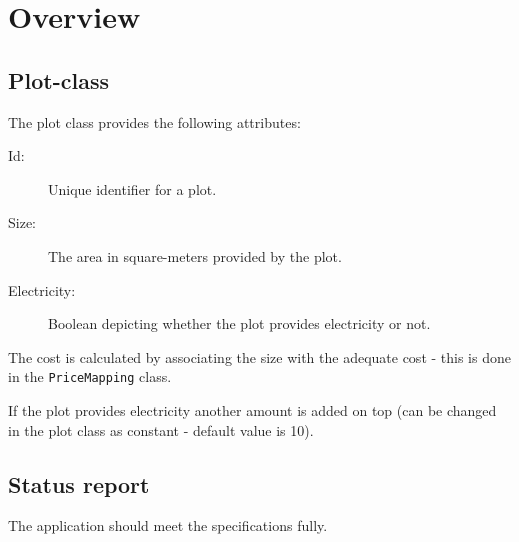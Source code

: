 \chapter{Overview}
\label{ch:report}

\section{Plot-class}

The plot class provides the following attributes:

\begin{description}
\item[Id:] Unique identifier for a plot.
\item[Size:] The area in square-meters provided by the plot.
\item[Electricity:] Boolean depicting whether the plot provides electricity or not.
\end{description}

The cost is calculated by associating the size with the adequate cost - this is done in the \texttt{PriceMapping} class.

If the plot provides electricity another amount is added on top (can be changed in the plot class as constant - default value is 10).

\section{Status report}

The application should meet the specifications fully.